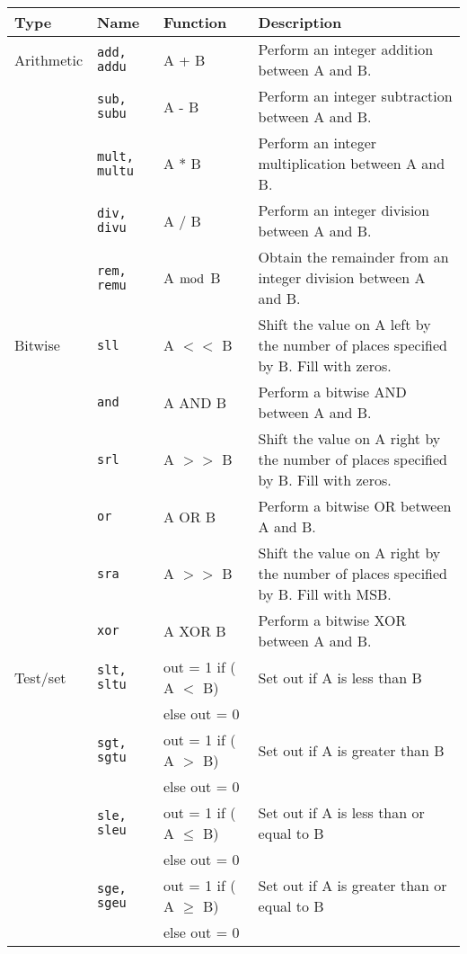 \documentclass[a4paper,10pt]{article}
\begin{document}
\begin{table}[h]
\begin{center}
\begin{tabular}{|l|l|l|p{75mm}|}
\hline
\textbf{Type} & \textbf{Name} & \textbf{Function} 
& \textbf{Description} \\
\hline
Arithmetic & \texttt{add, addu} & A + B & Perform an integer
addition between A and B. \\
\cline{2-4}
& \texttt{sub, subu} & A - B & Perform an integer
subtraction between A and B. \\
\cline{2-4}
& \texttt{mult, multu} & A * B & Perform an
integer multiplication between A and B. \\
\cline{2-4}
& \texttt{div, divu} & A / B & Perform an integer
division between A and B. \\
\cline{2-4} 
& \texttt{rem, remu} & A $\bmod$ B & Obtain the remainder from an
integer division between A and B. \\
\hline
Bitwise & \texttt{sll} & A $<<$ B & Shift the value on A left by the number of
places specified by B. Fill with zeros. \\
\cline{2-4}
& \texttt{and} & A AND B & Perform a bitwise AND between A and B. \\
\cline{2-4}
& \texttt{srl} & A $>>$ B & Shift the value on A right by the number of places
specified by B. Fill with zeros. \\
\cline{2-4}
& \texttt{or} & A OR B & Perform a bitwise OR between A and B.\\
\cline{2-4}
& \texttt{sra} & A $>>$ B & Shift the value on A right by the number of places
specified by B. Fill with MSB.\\
\cline{2-4}
& \texttt{xor} & A XOR B & Perform a bitwise XOR between A and B. \\
\hline
Test/set & \texttt{slt, sltu} & out = 1 if ( A $<$ B) & Set out if A
is less than B\\
& & else out = 0 & \\
\cline{2-4}
& \texttt{sgt, sgtu} & out = 1 if ( A $>$ B) & Set out if A
is greater than B \\
& & else out = 0 & \\
\cline{2-4}
& \texttt{sle, sleu} & out = 1 if ( A $\le$ B) & Set out if A
is less than or equal to B\\
& & else out = 0 & \\
\cline{2-4}
& \texttt{sge, sgeu} & out = 1 if ( A $\ge$ B) & Set out if A
is greater than or equal to B\\
& & else out = 0 & \\

\end{tabular}
\end{center}
\end{table}
\end{document}
